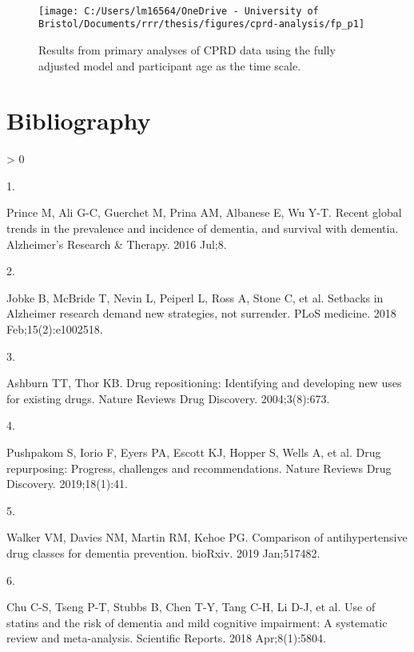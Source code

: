 \documentclass[
]{article}
\newlength{\cslhangindent}
\newlength{\csllabelwidth}
\newenvironment{CSLReferences}[2] %
 {%
  \setlength{\parindent}{0pt}
  \ifodd #1 \everypar{\setlength{\hangindent}{\cslhangindent}}\ignorespaces\fi
  \ifnum #2 > 0
  \setlength{\parskip}{#2\baselineskip}
  \fi
 }%
 {}
\newcommand{\CSLLeftMargin}[1]{\parbox[t]{\csllabelwidth}{#1}}
\newcommand{\CSLRightInline}[1]{\parbox[t]{\linewidth - \csllabelwidth}{#1}\break}
\begin{document}
~

\begin{figure}
\texttt{[image: C:/Users/lm16564/OneDrive - University of Bristol/Documents/rrr/thesis/figures/cprd-analysis/fp\_p1]} \caption{Results from primary analyses of CPRD data using the fully adjusted model and participant age as the time scale.}\label{fig:cprdPrimary}
\end{figure}

\newpage

\hypertarget{bibliography}{%
\section*{Bibliography}\label{bibliography}}

\hypertarget{refs}{}
\begin{CSLReferences}{0}{0}
\leavevmode\hypertarget{ref-prince2016}{}%
\CSLLeftMargin{1. }
\CSLRightInline{Prince M, Ali G-C, Guerchet M, Prina AM, Albanese E, Wu Y-T. Recent global trends in the prevalence and incidence of dementia, and survival with dementia. Alzheimer's Research \& Therapy. 2016 Jul;8. }

\leavevmode\hypertarget{ref-jobke2018}{}%
\CSLLeftMargin{2. }
\CSLRightInline{Jobke B, McBride T, Nevin L, Peiperl L, Ross A, Stone C, et al. Setbacks in {Alzheimer} research demand new strategies, not surrender. PLoS medicine. 2018 Feb;15(2):e1002518. }

\leavevmode\hypertarget{ref-ashburn2004}{}%
\CSLLeftMargin{3. }
\CSLRightInline{Ashburn TT, Thor KB. Drug repositioning: Identifying and developing new uses for existing drugs. Nature Reviews Drug Discovery. 2004;3(8):673. }

\leavevmode\hypertarget{ref-pushpakom2019}{}%
\CSLLeftMargin{4. }
\CSLRightInline{Pushpakom S, Iorio F, Eyers PA, Escott KJ, Hopper S, Wells A, et al. Drug repurposing: Progress, challenges and recommendations. Nature Reviews Drug Discovery. 2019;18(1):41. }

\leavevmode\hypertarget{ref-walker2019a}{}%
\CSLLeftMargin{5. }
\CSLRightInline{Walker VM, Davies NM, Martin RM, Kehoe PG. Comparison of antihypertensive drug classes for dementia prevention. bioRxiv. 2019 Jan;517482. }

\leavevmode\hypertarget{ref-chu2018}{}%
\CSLLeftMargin{6. }
\CSLRightInline{Chu C-S, Tseng P-T, Stubbs B, Chen T-Y, Tang C-H, Li D-J, et al. Use of statins and the risk of dementia and mild cognitive impairment: {A} systematic review and meta-analysis. Scientific Reports. 2018 Apr;8(1):5804. }


\end{CSLReferences}
\end{document}
